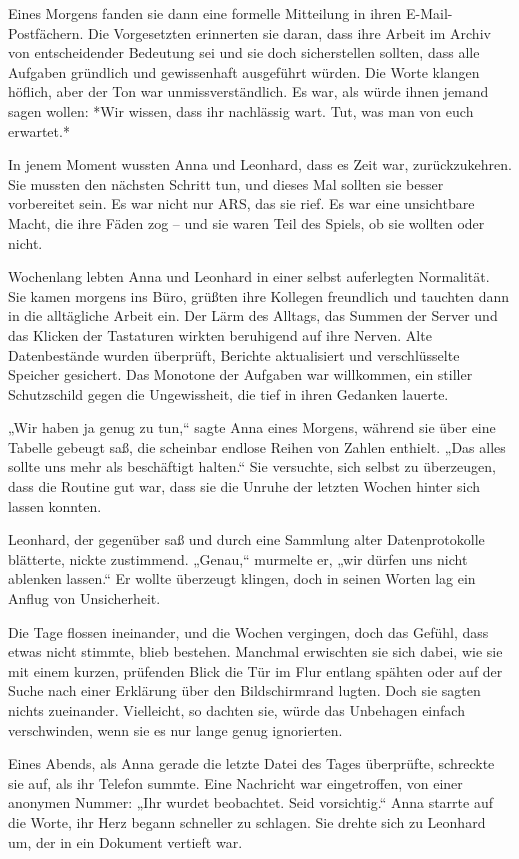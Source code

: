 \documentclass[
]{article}
\begin{document}
Eines Morgens fanden sie dann eine formelle Mitteilung in ihren
E-Mail-Postfächern. Die Vorgesetzten erinnerten sie daran, dass ihre
Arbeit im Archiv von entscheidender Bedeutung sei und sie doch
sicherstellen sollten, dass alle Aufgaben gründlich und gewissenhaft
ausgeführt würden. Die Worte klangen höflich, aber der Ton war
unmissverständlich. Es war, als würde ihnen jemand sagen wollen: *Wir
wissen, dass ihr nachlässig wart. Tut, was man von euch erwartet.*

In jenem Moment wussten Anna und Leonhard, dass es Zeit war,
zurückzukehren. Sie mussten den nächsten Schritt tun, und dieses Mal
sollten sie besser vorbereitet sein. Es war nicht nur ARS, das sie rief.
Es war eine unsichtbare Macht, die ihre Fäden zog -- und sie waren Teil
des Spiels, ob sie wollten oder nicht.

Wochenlang lebten Anna und Leonhard in einer selbst auferlegten
Normalität. Sie kamen morgens ins Büro, grüßten ihre Kollegen freundlich
und tauchten dann in die alltägliche Arbeit ein. Der Lärm des Alltags,
das Summen der Server und das Klicken der Tastaturen wirkten beruhigend
auf ihre Nerven. Alte Datenbestände wurden überprüft, Berichte
aktualisiert und verschlüsselte Speicher gesichert. Das Monotone der
Aufgaben war willkommen, ein stiller Schutzschild gegen die
Ungewissheit, die tief in ihren Gedanken lauerte.

„Wir haben ja genug zu tun,`` sagte Anna eines Morgens, während sie über
eine Tabelle gebeugt saß, die scheinbar endlose Reihen von Zahlen
enthielt. „Das alles sollte uns mehr als beschäftigt halten.`` Sie
versuchte, sich selbst zu überzeugen, dass die Routine gut war, dass sie
die Unruhe der letzten Wochen hinter sich lassen konnten.

Leonhard, der gegenüber saß und durch eine Sammlung alter
Datenprotokolle blätterte, nickte zustimmend. „Genau,`` murmelte er,
„wir dürfen uns nicht ablenken lassen.`` Er wollte überzeugt klingen,
doch in seinen Worten lag ein Anflug von Unsicherheit.

Die Tage flossen ineinander, und die Wochen vergingen, doch das Gefühl,
dass etwas nicht stimmte, blieb bestehen. Manchmal erwischten sie sich
dabei, wie sie mit einem kurzen, prüfenden Blick die Tür im Flur entlang
spähten oder auf der Suche nach einer Erklärung über den Bildschirmrand
lugten. Doch sie sagten nichts zueinander. Vielleicht, so dachten sie,
würde das Unbehagen einfach verschwinden, wenn sie es nur lange genug
ignorierten.

Eines Abends, als Anna gerade die letzte Datei des Tages überprüfte,
schreckte sie auf, als ihr Telefon summte. Eine Nachricht war
eingetroffen, von einer anonymen Nummer: „Ihr wurdet beobachtet. Seid
vorsichtig.`` Anna starrte auf die Worte, ihr Herz begann schneller zu
schlagen. Sie drehte sich zu Leonhard um, der in ein Dokument vertieft
war.
\end{document}
